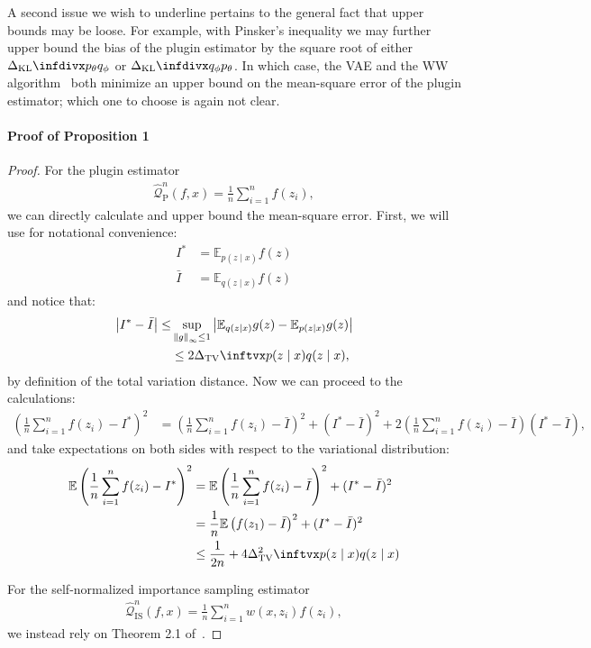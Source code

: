 A second issue we wish to underline pertains to the general fact that upper bounds may be loose. For example, with Pinsker's inequality we may further upper bound the bias of the plugin estimator by the square root of either $\kl{p_\theta}{q_\phi}$ or $\kl{q_\phi}{p_\theta}$. In which case, the VAE and the WW algorithm~\cite{le2018revisiting} both minimize an upper bound on the mean-square error of the plugin estimator; which one to choose is again not clear.


\paragraph{Proof of Proposition 1}
\begin{proof}
For the plugin estimator
\begin{align}
\hat{\mathcal{Q}}^n_{\textrm{P}}(f, x) = \frac{1}{n}\sum_{i=1}^nf(z_i),
\end{align}
we can directly calculate and upper bound the mean-square error. First, we will use for notational convenience:
\begin{align}
    I^* &= \mathbb{E}_{p(z \mid x)} f(z) \\
    \bar{I} &= \mathbb{E}_{q(z \mid x)} f(z)
\end{align}
and notice that:
\begin{align}
    \left|I^* - \bar{I}\right| \leq & \sup_{\norm{g}_\infty \leq 1}\left|\mathbb{E}_{q(z \mid x)} g(z) - \mathbb{E}_{p(z \mid x)} g(z) \right| \\
    &\leq 2\tv{p(z \mid x)}{q(z \mid x)},
\end{align}
by definition of the total variation distance. Now we can proceed to the calculations:
\begin{align}
    \left( \frac{1}{n}\sum_{i=1}^nf(z_i) - I^*  \right)^2  & = \left( \frac{1}{n}\sum_{i=1}^nf(z_i) - \bar{I}\right)^2 + (I^* - \bar{I})^2 + 2\left( \frac{1}{n}\sum_{i=1}^nf(z_i) - \bar{I}\right)(I^* - \bar{I}),
\end{align}
and take expectations on both sides with respect to the variational distribution:
\begin{align}
\mathbb{E}\left( \frac{1}{n}\sum_{i=1}^nf(z_i) - I^*  \right)^2  & = \mathbb{E}\left( \frac{1}{n}\sum_{i=1}^nf(z_i) - \bar{I}\right)^2 + (I^* - \bar{I})^2 \\
& = \frac{1}{n}\mathbb{E}\left(f(z_1) - \bar{I}\right)^2 + (I^* - \bar{I})^2 \\
& \leq \frac{1}{2n} + 4\tvsq{p(z \mid x)}{q(z \mid x)}
\end{align}

For the self-normalized importance sampling estimator
\begin{align}
\hat{\mathcal{Q}}^n_{\textrm{IS}}(f, x) = 
    \frac{1}{n}\sum_{i=1}^nw(x, z_i)f(z_i),
\end{align}
we instead rely on Theorem 2.1 of~\cite{Agapiou2017}.
\end{proof}


